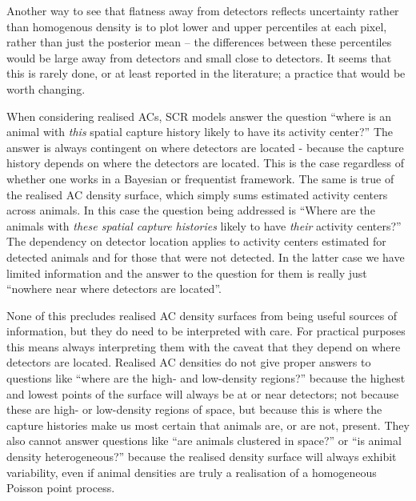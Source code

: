 \documentclass[10pt,a4paper]{article}
\begin{document}
Another way to see that flatness away from detectors reflects uncertainty rather than homogenous density is to plot lower and upper percentiles at each pixel, rather than just the posterior mean -- the differences between these percentiles would be large away from detectors and small close to detectors. It seems that this is rarely done, or at least reported in the literature; a practice that would be worth changing. 


When considering realised ACs, SCR models answer the question ``where is an animal with {\it this} spatial capture history likely to have its activity center?'' The answer is always contingent on where detectors are located - because the capture history depends on where the detectors are located. %
This is the case regardless of whether one works in a Bayesian or frequentist framework. The same is true of the realised AC density surface, which simply sums estimated activity centers across animals. In this case the question being addressed is ``Where are the animals with {\it these spatial capture histories} likely to have {\it their} activity centers?'' The dependency on detector location applies to activity centers estimated for detected animals and for those that were not detected. In the latter case we have limited information and the answer to the question for them is really just ``nowhere near where detectors are located''. 

None of this precludes realised AC density surfaces from being useful sources of information, but they do need to be interpreted with care. For practical purposes this means always interpreting them with the caveat that they depend on where detectors are located. Realised AC densities do not give proper answers to questions like ``where are the high- and low-density regions?'' because the highest and lowest points of the surface will always be at or near detectors; not because these are high- or low-density regions of space, but because this is where the capture histories make us most certain that animals are, or are not, present. They also cannot answer questions like ``are animals clustered in space?'' or ``is animal density heterogeneous?'' because the realised density surface will always exhibit variability, even if animal densities are truly a realisation of a homogeneous Poisson point process.
\end{document}
